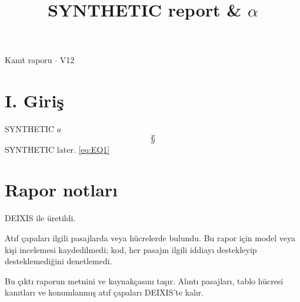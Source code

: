 \documentclass[journal]{IEEEtran}
\begin{document}
\renewcommand{\abstractname}{Özet}
\renewcommand{\IEEEkeywordsname}{Dizin Terimleri}
\renewcommand{\refname}{Kaynaklar}

\title{SYNTHETIC report \& \ensuremath{\alpha}}

\maketitle

\noindent Kanıt raporu \ensuremath{\cdot} V12

\section*{I. Giriş}

SYNTHETIC $a$
\begin{equation}
\label{eq:EQ1}
x
\end{equation}
\begin{equation*}
y
\end{equation*}
\cite{Synth26} SYNTHETIC later. \eqref{eq:EQ1} \cite{Synth26}

\section*{Rapor notları}

DEIXIS ile üretildi.

Atıf çapaları ilgili pasajlarda veya hücrelerde bulundu. Bu rapor için model veya kişi incelemesi kaydedilmedi; kod, her pasajın ilgili iddiayı destekleyip desteklemediğini denetlemedi.

Bu çıktı raporun metnini ve kaynakçasını taşır. Alıntı pasajları, tablo hücresi kanıtları ve konumlanmış atıf çapaları DEIXIS'te kalır.




\end{document}
